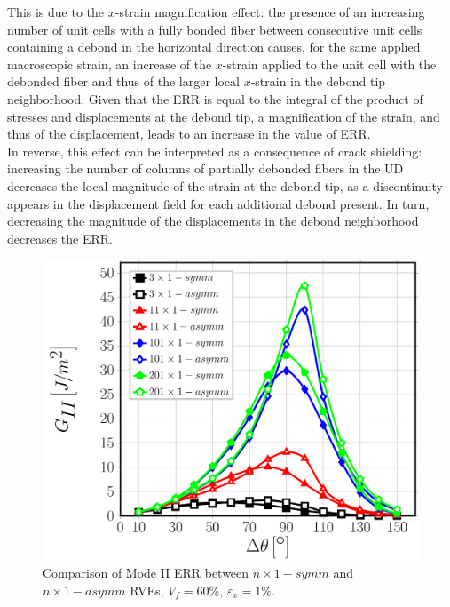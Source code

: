 This is due to the $x$-strain magnification effect: the presence of an increasing number of unit cells with a fully bonded fiber between consecutive unit cells containing a debond in the horizontal direction causes, for the same applied macroscopic strain, an increase of the $x$-strain applied to the unit cell with the debonded fiber and thus of the larger local $x$-strain in the debond tip neighborhood. Given that the ERR is equal to the integral of the product of stresses and displacements at the debond tip, a magnification of the strain, and thus of the displacement, leads to an increase in the value of ERR.\\
In reverse, this effect can be interpreted as a consequence of crack shielding: increasing the number of columns of partially debonded fibers in the UD decreases the local magnitude of the strain at the debond tip, as a discontinuity appears in the displacement field for each additional debond present. In turn, decreasing the magnitude of the displacements in the debond neighborhood decreases the ERR.

\begin{figure}[!htb]
\centering
  \includegraphics[width=\textwidth]{paperD/nx1-coupling-vf60-GII.pdf}
\caption{Comparison of Mode II ERR between $n \times 1-symm$ and $n \times 1-asymm$ RVEs, $V_{f}=60\%$, $\varepsilon_{x}=1\%$.}\label{paperD:fig:nx1-GII}
\end{figure}


